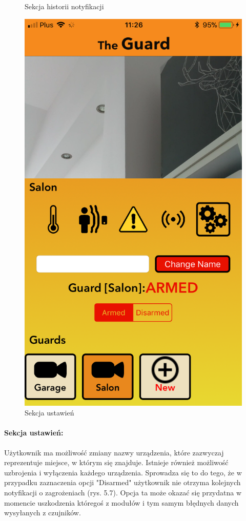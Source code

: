\begin{figure}[ht]
\begin{minipage}{.4\linewidth}
    \caption{Sekcja historii notyfikacji}
    \label{img1}
\end{minipage}
\hspace{.05\linewidth}
\begin{minipage}{.4\linewidth}
    \includegraphics[width=\linewidth]{ios_screenshots/settings.png}
    \caption{Sekcja ustawień}
    \label{img2}
\end{minipage}
\end{figure} 
\paragraph{Sekcja ustawień:}
Użytkownik ma możliwość zmiany nazwy urządzenia, które zazwyczaj reprezentuje miejsce, w którym się znajduje. Istnieje również możliwość uzbrojenia i wyłączenia każdego urządzenia. Sprowadza się to do tego, że w przypadku zaznaczenia opcji "Disarmed" użytkownik nie otrzyma kolejnych notyfikacji o zagrożeniach (rys. 5.7). Opcja ta może okazać się przydatna w momencie uszkodzenia któregoś z modułów i tym samym błędnych danych wysyłanych z czujników.
